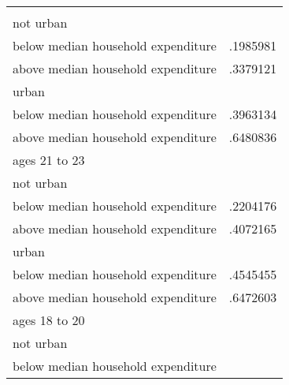 \begin{table}[!h]
\begin{tabular}{ll}
  \multicolumn{1}{|r}{} \\
\multicolumn{1}{l}{\hspace{1em}not urban} &
  \multicolumn{1}{|r}{} \\
\multicolumn{1}{l}{\hspace{2em}below median household expenditure} &
  \multicolumn{1}{|r}{.1985981} \\
\multicolumn{1}{l}{\hspace{2em}above median household expenditure} &
  \multicolumn{1}{|r}{.3379121} \\
\multicolumn{1}{l}{\hspace{1em}urban} &
  \multicolumn{1}{|r}{} \\
\multicolumn{1}{l}{\hspace{2em}below median household expenditure} &
  \multicolumn{1}{|r}{.3963134} \\
\multicolumn{1}{l}{\hspace{2em}above median household expenditure} &
  \multicolumn{1}{|r}{.6480836} \\
\multicolumn{1}{l}{ages 21 to 23} &
  \multicolumn{1}{|r}{} \\
\multicolumn{1}{l}{\hspace{1em}not urban} &
  \multicolumn{1}{|r}{} \\
\multicolumn{1}{l}{\hspace{2em}below median household expenditure} &
  \multicolumn{1}{|r}{.2204176} \\
\multicolumn{1}{l}{\hspace{2em}above median household expenditure} &
  \multicolumn{1}{|r}{.4072165} \\
\multicolumn{1}{l}{\hspace{1em}urban} &
  \multicolumn{1}{|r}{} \\
\multicolumn{1}{l}{\hspace{2em}below median household expenditure} &
  \multicolumn{1}{|r}{.4545455} \\
\multicolumn{1}{l}{\hspace{2em}above median household expenditure} &
  \multicolumn{1}{|r}{.6472603} \\
\multicolumn{1}{l}{ages 18 to 20} &
  \multicolumn{1}{|r}{} \\
\multicolumn{1}{l}{\hspace{1em}not urban} &
  \multicolumn{1}{|r}{} \\
\multicolumn{1}{l}{\hspace{2em}below median household expenditure} &

\end{tabular}
\end{table}
